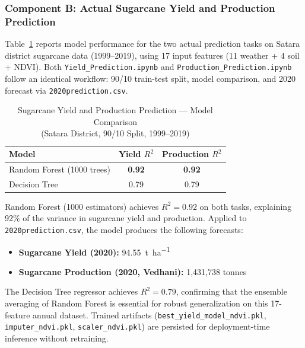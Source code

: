 \documentclass[conference]{IEEEtran}
\begin{document}
\subsubsection{Component B: Actual Sugarcane Yield and Production Prediction}

Table~\ref{tab:sugarcane} reports model performance for the two actual
prediction tasks on Satara district sugarcane data (1999--2019), using 17
input features (11 weather + 4 soil + NDVI). Both \texttt{Yield\_Prediction.ipynb}
and \texttt{Production\_Prediction.ipynb} follow an identical workflow: 90/10
train-test split, model comparison, and 2020 forecast via \texttt{2020prediction.csv}.

\begin{table}[htbp]
\caption{Sugarcane Yield and Production Prediction --- Model Comparison\\
(Satara District, 90/10 Split, 1999--2019)}
\label{tab:sugarcane}
\centering
\renewcommand{\arraystretch}{1.15}
\begin{tabular}{@{}lcc@{}}
\toprule
\textbf{Model} & \textbf{Yield $R^2$} & \textbf{Production $R^2$} \\
\midrule
Random Forest (1000 trees) & \textbf{0.92} & \textbf{0.92} \\
Decision Tree              & 0.79          & 0.79          \\
\bottomrule
\end{tabular}
\end{table}

Random Forest (1000 estimators) achieves $R^2 = 0.92$ on both tasks,
explaining 92\% of the variance in sugarcane yield and production. Applied
to \texttt{2020prediction.csv}, the model produces the following forecasts:

\begin{itemize}[leftmargin=*]
  \item \textbf{Sugarcane Yield (2020):} \SI{94.55}{\tonne\per\hectare}
  \item \textbf{Sugarcane Production (2020, Vedhani):} 1{,}431{,}738 tonnes
\end{itemize}

The Decision Tree regressor achieves $R^2 = 0.79$, confirming that the
ensemble averaging of Random Forest is essential for robust generalization on
this 17-feature annual dataset. Trained artifacts (\texttt{best\_yield\_model\_ndvi.pkl},
\texttt{imputer\_ndvi.pkl}, \texttt{scaler\_ndvi.pkl}) are persisted for
deployment-time inference without retraining.
\end{document}
